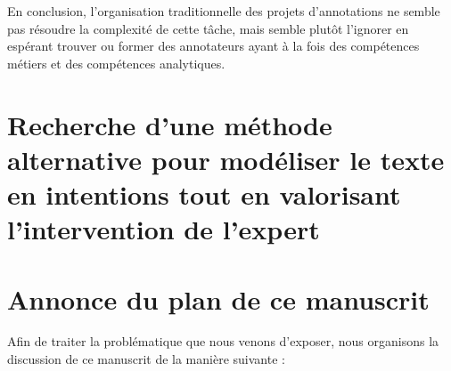 		En conclusion, l'organisation traditionnelle des projets d'annotations ne semble pas résoudre la complexité de cette tâche, mais semble plutôt l'ignorer en espérant trouver ou former des annotateurs ayant à la fois des compétences métiers et des compétences analytiques.
		
		
	\section*{Recherche d'une méthode alternative pour modéliser le texte en intentions tout en valorisant l'intervention de l'expert}
		
		
		
		
	\section*{Annonce du plan de ce manuscrit}
		
		Afin de traiter la problématique que nous venons d'exposer, nous organisons la discussion de ce manuscrit de la manière suivante :
		
